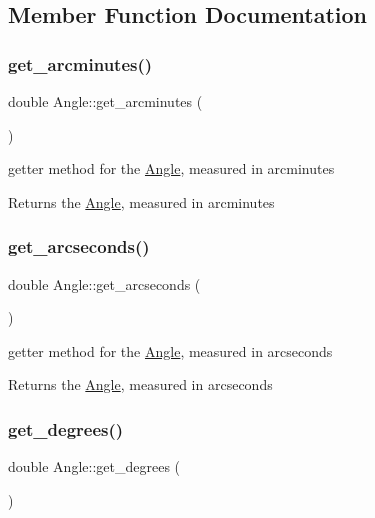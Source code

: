 \subsection{Member Function Documentation}
\mbox{\label{classAngle_a2664851f26ad091294ed0dd2737026b2}} 
\subsubsection{\texorpdfstring{get\+\_\+arcminutes()}{get\_arcminutes()}}
{\footnotesize\ttfamily double Angle\+::get\+\_\+arcminutes (\begin{DoxyParamCaption}{ }\end{DoxyParamCaption})}



getter method for the \mbox{\hyperlink{classAngle}{Angle}}, measured in arcminutes 

\begin{DoxyReturn}{Returns}
the \mbox{\hyperlink{classAngle}{Angle}}, measured in arcminutes 
\end{DoxyReturn}
\mbox{\label{classAngle_a64ecc29aea0d9487058a6bec3f141e54}} 
\subsubsection{\texorpdfstring{get\+\_\+arcseconds()}{get\_arcseconds()}}
{\footnotesize\ttfamily double Angle\+::get\+\_\+arcseconds (\begin{DoxyParamCaption}{ }\end{DoxyParamCaption})}



getter method for the \mbox{\hyperlink{classAngle}{Angle}}, measured in arcseconds 

\begin{DoxyReturn}{Returns}
the \mbox{\hyperlink{classAngle}{Angle}}, measured in arcseconds 
\end{DoxyReturn}
\mbox{\label{classAngle_a592d871a119dd6470e3af13e76debb07}} 
\subsubsection{\texorpdfstring{get\+\_\+degrees()}{get\_degrees()}}
{\footnotesize\ttfamily double Angle\+::get\+\_\+degrees (\begin{DoxyParamCaption}{ }\end{DoxyParamCaption})}



